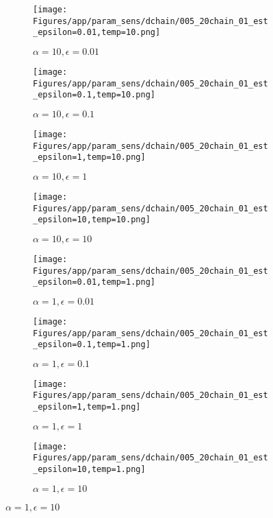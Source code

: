 \documentclass{article}
\theoremstyle{plain}
\begin{document}
\begin{appendices}
\begin{figure}
                \begin{subfigure}[b]{0.24\textwidth}
                    \centering
                    \texttt{[image: Figures/app/param\_sens/dchain/005\_20chain\_01\_est\_epsilon=0.01,temp=10.png]}
                    \caption*{$\alpha=10,\epsilon=0.01$}
                \end{subfigure}
                \begin{subfigure}[b]{0.24\textwidth}
                    \centering
                    \texttt{[image: Figures/app/param\_sens/dchain/005\_20chain\_01\_est\_epsilon=0.1,temp=10.png]}
                    \caption*{$\alpha=10,\epsilon=0.1$}
                \end{subfigure}
                \begin{subfigure}[b]{0.24\textwidth}
                    \centering
                    \texttt{[image: Figures/app/param\_sens/dchain/005\_20chain\_01\_est\_epsilon=1,temp=10.png]}
                    \caption*{$\alpha=10,\epsilon=1$}
                \end{subfigure}
                \begin{subfigure}[b]{0.24\textwidth}
                    \centering
                    \texttt{[image: Figures/app/param\_sens/dchain/005\_20chain\_01\_est\_epsilon=10,temp=10.png]}
                    \caption*{$\alpha=10,\epsilon=10$}
                \end{subfigure}
                
                \begin{subfigure}[b]{0.24\textwidth}
                    \centering
                    \texttt{[image: Figures/app/param\_sens/dchain/005\_20chain\_01\_est\_epsilon=0.01,temp=1.png]}
                    \caption*{$\alpha=1,\epsilon=0.01$}
                \end{subfigure}
                \begin{subfigure}[b]{0.24\textwidth}
                    \centering
                    \texttt{[image: Figures/app/param\_sens/dchain/005\_20chain\_01\_est\_epsilon=0.1,temp=1.png]}
                    \caption*{$\alpha=1,\epsilon=0.1$}
                \end{subfigure}
                \begin{subfigure}[b]{0.24\textwidth}
                    \centering
                    \texttt{[image: Figures/app/param\_sens/dchain/005\_20chain\_01\_est\_epsilon=1,temp=1.png]}
                    \caption*{$\alpha=1,\epsilon=1$}
                \end{subfigure}
                \begin{subfigure}[b]{0.24\textwidth}
                    \centering
                    \texttt{[image: Figures/app/param\_sens/dchain/005\_20chain\_01\_est\_epsilon=10,temp=1.png]}
                    \caption*{$\alpha=1,\epsilon=10$}
                \end{subfigure}
                

\end{figure}
\end{appendices}
\end{document}
